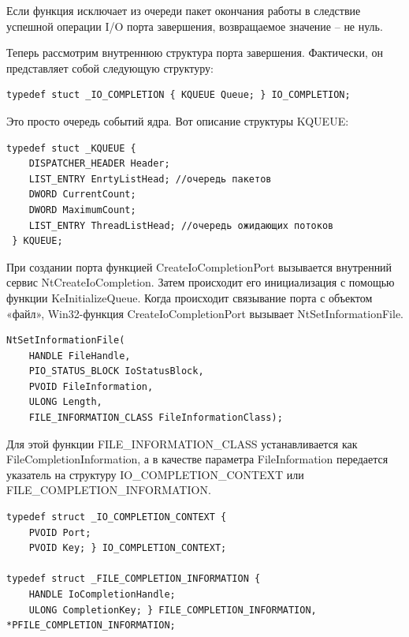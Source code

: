 \documentclass[a4paper, 12pt]{report}		%
\begin{document}
Если функция исключает из очереди пакет окончания работы в следствие успешной операции I/O порта завершения, возвращаемое значение -- не нуль.

Теперь рассмотрим внутреннюю структура порта завершения. Фактически, он представляет собой следующую структуру:

\begin{verbatim}
typedef stuct _IO_COMPLETION { KQUEUE Queue; } IO_COMPLETION;
\end{verbatim}

Это просто очередь событий ядра. Вот описание структуры KQUEUE:

\begin{verbatim}
typedef stuct _KQUEUE {
    DISPATCHER_HEADER Header;
    LIST_ENTRY EnrtyListHead; //очередь пакетов
    DWORD CurrentCount;
    DWORD MaximumCount;
    LIST_ENTRY ThreadListHead; //очередь ожидающих потоков
 } KQUEUE;
\end{verbatim}

При создании порта функцией CreateIoCompletionPort вызывается внутренний сервис NtCreateIoCompletion. Затем происходит его инициализация с помощью функции KeInitializeQueue. Когда происходит связывание порта с объектом «файл», Win32-функция CreateIoCompletionPort вызывает NtSetInformationFile.

\begin{verbatim}
NtSetInformationFile(
    HANDLE FileHandle,
    PIO_STATUS_BLOCK IoStatusBlock,
    PVOID FileInformation,
    ULONG Length,
    FILE_INFORMATION_CLASS FileInformationClass);
\end{verbatim}

Для этой функции FILE\_INFORMATION\_CLASS устанавливается как FileCompletionInformation, а в качестве параметра FileInformation передается указатель на структуру IO\_COMPLETION\_CONTEXT или FILE\_COMPLETION\_INFORMATION.

\begin{verbatim}
typedef struct _IO_COMPLETION_CONTEXT {
    PVOID Port;
    PVOID Key; } IO_COMPLETION_CONTEXT;
   
typedef struct _FILE_COMPLETION_INFORMATION {
    HANDLE IoCompletionHandle;
    ULONG CompletionKey; } FILE_COMPLETION_INFORMATION, *PFILE_COMPLETION_INFORMATION;
\end{verbatim}
\end{document}
